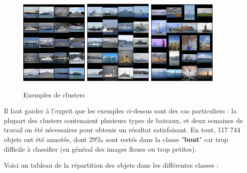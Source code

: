 \begin{figure}[H]
    \centering
    \includegraphics[width=0.3\textwidth]{./img/yachts.png}
    \includegraphics[width=0.3\textwidth]{./img/warships.png}
    \includegraphics[width=0.3\textwidth]{./img/lighthouses.png}
    \caption{Exemples de clusters}
\end{figure}

Il faut garder à l'exprit que les exemples ci-dessus sont des cas particuliers : la plupart des
clusters contenaient plusieurs types de bateaux, et deux semaines de travail on été nécessaires
pour obtenir un résultat satisfaisant. En tout, 117 744 objets ont été annotés, dont 29‰ sont restés
dans la classe "\textbf{boat}" car trop difficile à classifier (en général des images floues ou trop petites).

Voici un tableau de la répartition des objets dans les différentes classes : \\

